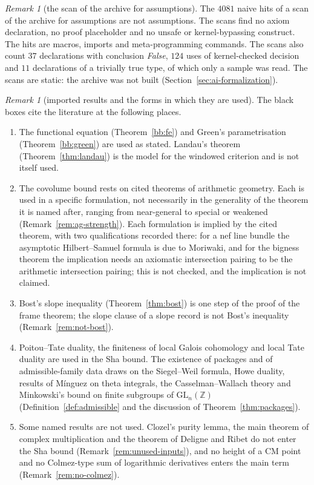 \documentclass[11pt]{amsbook}
\theoremstyle{plain}
\theoremstyle{definition}
\theoremstyle{remark}
\newtheorem{remark}[theorem]{Remark}
\numberwithin{equation}{section}
\numberwithin{figure}{chapter}
\numberwithin{table}{chapter}
\newcommand{\Z}{\mathbb{Z}}
\begin{document}
\begin{remark}[the scan of the archive for assumptions]\label{rem:ai-scan}
The $4081$ naive hits of a scan of the archive for assumptions are not
assumptions. The scans find no axiom declaration, no proof placeholder
and no unsafe or kernel-bypassing construct. The hits are macros,
imports and meta-programming commands. The scans also count $37$
declarations with conclusion \emph{False}, $124$ uses of
kernel-checked decision and $11$ declarations of a trivially true
type, of which only a sample was read. The scans are static: the
archive was not built (Section~\ref{sec:ai-formalization}).
\end{remark}

\begin{remark}[imported results and the forms in which they are used]
\label{rem:bb-imported}
The black boxes cite the literature at the following places.
\begin{enumerate}[label=(\arabic*)]
\item The functional equation (Theorem~\ref{bb:fe}) and Green's
parametrisation (Theorem~\ref{bb:green}) are used as stated.
Landau's theorem (Theorem~\ref{thm:landau}) is the model for the
windowed criterion and is not itself used.
\item The covolume bound rests on cited theorems of arithmetic
geometry. Each is used in a specific formulation, not necessarily
in the generality of the theorem it is named after, ranging from
near-general to special or weakened (Remark~\ref{rem:ag-strength}).
Each formulation is implied by the
cited theorem, with two qualifications recorded there: for a nef
line bundle the asymptotic Hilbert--Samuel formula is due to
Moriwaki, and for the bigness theorem the implication needs an
axiomatic intersection pairing to be the arithmetic intersection
pairing; this is not checked, and the implication is not claimed.
\item Bost's slope inequality (Theorem~\ref{thm:bost}) is one step
of the proof of the frame theorem; the slope clause of a slope
record is not Bost's inequality (Remark~\ref{rem:not-bost}).
\item Poitou--Tate duality, the finiteness of local Galois
cohomology and local Tate duality are used in the Sha bound. The
existence of packages and of admissible-family data draws on the
Siegel--Weil formula, Howe duality, results of M\'inguez on theta
integrals, the Casselman--Wallach theory and Minkowski's bound on
finite subgroups of $\mathrm{GL}_n(\Z)$
(Definition~\ref{def:admissible} and the discussion of
Theorem~\ref{thm:packages}).
\item Some named results are not used. Clozel's purity lemma, the
main theorem of complex multiplication and the theorem of Deligne
and Ribet do not enter the Sha bound
(Remark~\ref{rem:unused-inputs}), and no height of a CM point and no
Colmez-type sum of logarithmic derivatives enters the main term
(Remark~\ref{rem:no-colmez}).
\end{enumerate}
\end{remark}
\end{document}
